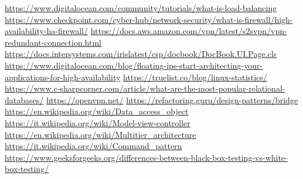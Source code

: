 \begin{thebibliography}{9}
     \url{https://www.digitalocean.com/community/tutorials/what-is-load-balancing}
     \url{https://www.checkpoint.com/cyber-hub/network-security/what-is-firewall/high-availability-ha-firewall/}
     \url{https://docs.aws.amazon.com/vpn/latest/s2svpn/vpn-redundant-connection.html}
     \url{https://docs.intersystems.com/irislatest/csp/docbook/DocBook.UI.Page.cls}
     \url{https://www.digitalocean.com/blog/floating-ips-start-architecting-your-applications-for-high-availability}
     \url{https://truelist.co/blog/linux-statistics/}
     \url{https://www.c-sharpcorner.com/article/what-are-the-most-popular-relational-databases/}
     \url{https://openvpn.net/}
     \url{https://refactoring.guru/design-patterns/bridge}
     \url{https://en.wikipedia.org/wiki/Data_access_object}
     \url{https://it.wikipedia.org/wiki/Model-view-controller}
     \url{https://en.wikipedia.org/wiki/Multitier_architecture}
     \url{https://it.wikipedia.org/wiki/Command_pattern}
     \url{https://www.geeksforgeeks.org/differences-between-black-box-testing-vs-white-box-testing/}
\end{thebibliography}